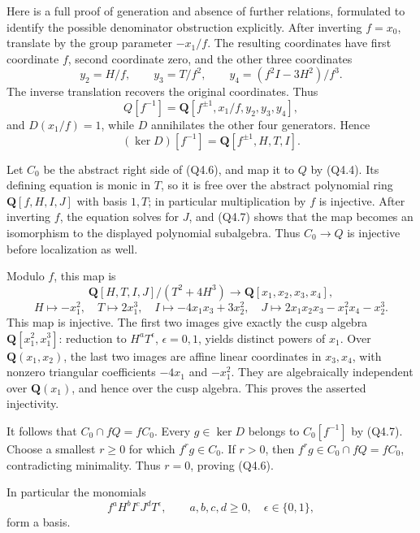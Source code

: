 \documentclass[
  10pt,
]{article}
\begin{document}
Here is a full proof of generation and absence of further relations,
formulated to identify the possible denominator obstruction explicitly.
After inverting \(f=x_0\), translate by the group parameter \(-x_1/f\).
The resulting coordinates have first coordinate \(f\), second coordinate
zero, and the other three coordinates \[
y_2=H/f,\qquad y_3=T/f^2,\qquad
y_4=(f^2I-3H^2)/f^3.
\] The inverse translation recovers the original coordinates. Thus \[
Q[f^{-1}]
=\mathbf Q[f^{\pm1},x_1/f,y_2,y_3,y_4],
\] and \(D(x_1/f)=1\), while \(D\) annihilates the other four
generators. Hence \[
(\ker D)[f^{-1}]
=\mathbf Q[f^{\pm1},H,T,I].
\tag{Q4.7}
\]

Let \(C_0\) be the abstract right side of (Q4.6), and map it to \(Q\) by
(Q4.4). Its defining equation is monic in \(T\), so it is free over the
abstract polynomial ring \(\mathbf Q[f,H,I,J]\) with basis \(1,T\); in
particular multiplication by \(f\) is injective. After inverting \(f\),
the equation solves for \(J\), and (Q4.7) shows that the map becomes an
isomorphism to the displayed polynomial subalgebra. Thus \(C_0\to Q\) is
injective before localization as well.

Modulo \(f\), this map is \[
\mathbf Q[H,T,I,J]/(T^2+4H^3)
\longrightarrow \mathbf Q[x_1,x_2,x_3,x_4],
\] \[
H\mapsto-x_1^2,\quad T\mapsto2x_1^3,\quad
I\mapsto-4x_1x_3+3x_2^2,\quad
J\mapsto2x_1x_2x_3-x_1^2x_4-x_2^3.
\tag{Q4.8}
\] This map is injective. The first two images give exactly the cusp
algebra \(\mathbf Q[x_1^2,x_1^3]\): reduction to \(H^aT^\epsilon\),
\(\epsilon=0,1\), yields distinct powers of \(x_1\). Over
\(\mathbf Q(x_1,x_2)\), the last two images are affine linear
coordinates in \(x_3,x_4\), with nonzero triangular coefficients
\(-4x_1\) and \(-x_1^2\). They are algebraically independent over
\(\mathbf Q(x_1)\), and hence over the cusp algebra. This proves the
asserted injectivity.

It follows that \(C_0\cap fQ=fC_0\). Every \(g\in\ker D\) belongs to
\(C_0[f^{-1}]\) by (Q4.7). Choose a smallest \(r\ge0\) for which
\(f^rg\in C_0\). If \(r>0\), then \(f^rg\in C_0\cap fQ=fC_0\),
contradicting minimality. Thus \(r=0\), proving (Q4.6).

In particular the monomials \[
f^aH^bI^cJ^dT^\epsilon,\qquad
a,b,c,d\ge0,\quad\epsilon\in\{0,1\},
\tag{Q4.9}
\] form a basis.
\end{document}
